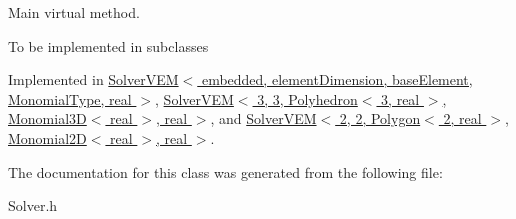 Main virtual method. 

To be implemented in subclasses 

Implemented in \hyperlink{class_solver_v_e_m_acdbd3c97184fbd831b2f21e28148c33e}{Solver\+V\+E\+M$<$ embedded, element\+Dimension, base\+Element, Monomial\+Type, real $>$}, \hyperlink{class_solver_v_e_m_acdbd3c97184fbd831b2f21e28148c33e}{Solver\+V\+E\+M$<$ 3, 3, Polyhedron$<$ 3, real $>$, Monomial3\+D$<$ real $>$, real $>$}, and \hyperlink{class_solver_v_e_m_acdbd3c97184fbd831b2f21e28148c33e}{Solver\+V\+E\+M$<$ 2, 2, Polygon$<$ 2, real $>$, Monomial2\+D$<$ real $>$, real $>$}.



The documentation for this class was generated from the following file\+:\begin{DoxyCompactItemize}
\item 
Solver.\+h\end{DoxyCompactItemize}
